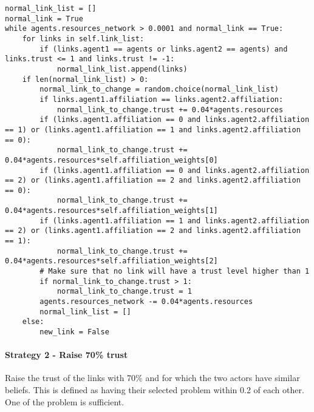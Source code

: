 \begin{lstlisting}
normal_link_list = []
normal_link = True
while agents.resources_network > 0.0001 and normal_link == True:
	for links in self.link_list:
		if (links.agent1 == agents or links.agent2 == agents) and links.trust <= 1 and links.trust != -1:
			normal_link_list.append(links)
	if len(normal_link_list) > 0:
		normal_link_to_change = random.choice(normal_link_list)
		if links.agent1.affiliation == links.agent2.affiliation:
			normal_link_to_change.trust += 0.04*agents.resources
		if (links.agent1.affiliation == 0 and links.agent2.affiliation == 1) or (links.agent1.affiliation == 1 and links.agent2.affiliation == 0):							
			normal_link_to_change.trust += 0.04*agents.resources*self.affiliation_weights[0]
		if (links.agent1.affiliation == 0 and links.agent2.affiliation == 2) or (links.agent1.affiliation == 2 and links.agent2.affiliation == 0):
			normal_link_to_change.trust += 0.04*agents.resources*self.affiliation_weights[1]
		if (links.agent1.affiliation == 1 and links.agent2.affiliation == 2) or (links.agent1.affiliation == 2 and links.agent2.affiliation == 1):
			normal_link_to_change.trust += 0.04*agents.resources*self.affiliation_weights[2]
		# Make sure that no link will have a trust level higher than 1
		if normal_link_to_change.trust > 1:
			normal_link_to_change.trust = 1
		agents.resources_network -= 0.04*agents.resources
		normal_link_list = []
	else:
		new_link = False
\end{lstlisting}

\paragraph{Strategy 2 - Raise 70\% trust}

Raise the trust of the links with 70\% and for which the two actors have similar beliefs. This is defined as having their selected problem within 0.2 of each other. One of the problem is sufficient.

